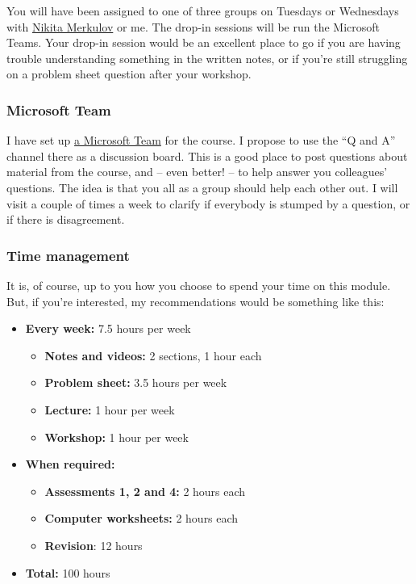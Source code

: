 \documentclass[
  a4paper,
]{article}
\providecommand{\tightlist}{%
  \setlength{\itemsep}{0pt}\setlength{\parskip}{0pt}}
\theoremstyle{definition}
\theoremstyle{definition}
\theoremstyle{definition}
\theoremstyle{remark}
\begin{document}
You will have been assigned to one of three groups on Tuesdays or Wednesdays with \href{https://eps.leeds.ac.uk/maths/pgr/4992/nikita-merkulov}{Nikita Merkulov} or me. The drop-in sessions will be run the Microsoft Teams. Your drop-in session would be an excellent place to go if you are having trouble understanding something in the written notes, or if you're still struggling on a problem sheet question after your workshop.

\hypertarget{team}{%
\subsubsection*{Microsoft Team}\label{team}}

I have set up \href{https://teams.microsoft.com/l/channel/19\%3a8cb8008c95204bbeaefa8ee7d48c1a13\%40thread.tacv2/General?groupId=1c138eac-0c54-43b0-9d20-d4cf3d65c40a\&tenantId=bdeaeda8-c81d-45ce-863e-5232a535b7cb}{a Microsoft Team} for the course. I propose to use the ``Q and A'' channel there as a discussion board. This is a good place to post questions about material from the course, and -- even better! -- to help answer you colleagues' questions. The idea is that you all as a group should help each other out. I will visit a couple of times a week to clarify if everybody is stumped by a question, or if there is disagreement.

\hypertarget{time}{%
\subsubsection*{Time management}\label{time}}

It is, of course, up to you how you choose to spend your time on this module. But, if you're interested, my recommendations would be something like this:

\begin{itemize}
\tightlist
\item
  \textbf{Every week:} 7.5 hours per week

  \begin{itemize}
  \tightlist
  \item
    \textbf{Notes and videos:} 2 sections, 1 hour each
  \item
    \textbf{Problem sheet:} 3.5 hours per week
  \item
    \textbf{Lecture:} 1 hour per week
  \item
    \textbf{Workshop:} 1 hour per week
  \end{itemize}
\item
  \textbf{When required:}

  \begin{itemize}
  \tightlist
  \item
    \textbf{Assessments 1, 2 and 4:} 2 hours each
  \item
    \textbf{Computer worksheets:} 2 hours each
  \item
    \textbf{Revision}: 12 hours
  \end{itemize}
\item
  \textbf{Total:} 100 hours
\end{itemize}
\end{document}
